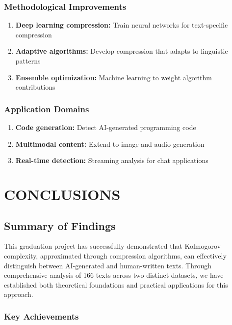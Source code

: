 \documentclass[12pt,a4paper]{report}
\begin{document}
\subsection{Methodological Improvements}

\begin{enumerate}
    \item \textbf{Deep learning compression:} Train neural networks for text-specific compression
    \item \textbf{Adaptive algorithms:} Develop compression that adapts to linguistic patterns
    \item \textbf{Ensemble optimization:} Machine learning to weight algorithm contributions
\end{enumerate}

\subsection{Application Domains}

\begin{enumerate}
    \item \textbf{Code generation:} Detect AI-generated programming code
    \item \textbf{Multimodal content:} Extend to image and audio generation
    \item \textbf{Real-time detection:} Streaming analysis for chat applications
\end{enumerate}


\chapter{CONCLUSIONS}

\section{Summary of Findings}

This graduation project has successfully demonstrated that Kolmogorov complexity, approximated through compression algorithms, can effectively distinguish between AI-generated and human-written texts. Through comprehensive analysis of 166 texts across two distinct datasets, we have established both theoretical foundations and practical applications for this approach.

\subsection{Key Achievements}
\end{document}
